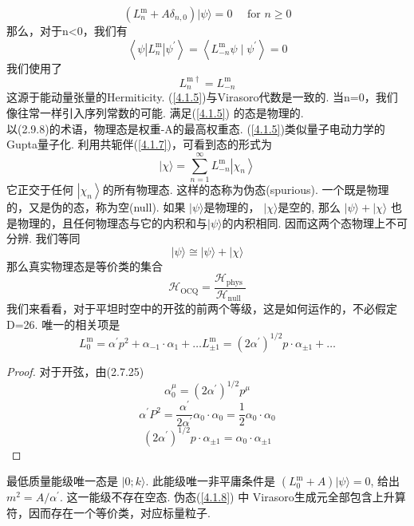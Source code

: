 \begin{equation}\label{4.1.5}
\left(L_{n}^{\mathrm{m}}+A \delta_{n, 0}\right)|\psi\rangle=0 \quad \text { for } n \geq 0
\end{equation}
那么，对于n<0，我们有
\begin{equation}
\left\langle\psi\left|L_{n}^{\mathrm{m}}\right| \psi^{\prime}\right\rangle=\left\langle L_{-n}^{\mathrm{m}} \psi \mid \psi^{\prime}\right\rangle=0
\end{equation}
我们使用了
\begin{equation}\label{4.1.7}
L_{n}^{\mathrm{m} \dagger}=L_{-n}^{\mathrm{m}}
\end{equation}
这源于能动量张量的Hermiticity. (\ref{4.1.5})与Virasoro代数是一致的. 当n=0，我们像往常一样引入序列常数的可能. 满足(\ref{4.1.5}) 的态是物理的.\\
以(2.9.8)的术语，物理态是权重-A的最高权重态. (\ref{4.1.5})类似量子电动力学的Gupta量子化. 利用共轭伴(\ref{4.1.7})，可看到态的形式为
\begin{equation}\label{4.1.8}
|\chi\rangle=\sum_{n=1}^{\infty} L_{-n}^{\mathrm{m}}\left|\chi_{n}\right\rangle
\end{equation}
它正交于任何 $\left|\chi_{n}\right\rangle $的所有物理态. 这样的态称为伪态(spurious). 一个既是物理的，又是伪的态，称为空(null). 如果 $|\psi\rangle$是物理的， $|\chi\rangle$是空的, 那么 $|\psi\rangle+|\chi\rangle$ 也是物理的，且任何物理态与它的内积和与$|\psi\rangle$的内积相同. 因而这两个态物理上不可分辨. 我们等同
\begin{equation}
|\psi\rangle \cong|\psi\rangle+|\chi\rangle
\end{equation}
那么真实物理态是等价类的集合
\begin{equation}
\mathscr{H}_{\mathrm{OCQ}}=\frac{\mathscr{H}_{\text {phys }}}{\mathscr{H}_{\text {null }}}
\end{equation}
我们来看看，对于平坦时空中的开弦的前两个等级，这是如何运作的，不必假定D=26. 唯一的相关项是
\begin{subequations}
\begin{equation}
L_{0}^{\mathrm{m}}=\alpha^{\prime} p^{2}+\alpha_{-1} \cdot \alpha_{1}+\ldots
\end{equation}
\begin{equation}
L_{\pm 1}^{\mathrm{m}}=\left(2 \alpha^{\prime}\right)^{1 / 2} p \cdot \alpha_{\pm 1}+\ldots
\end{equation}
\end{subequations}

\begin{proof}
对于开弦，由(2.7.25)
$$
\alpha_{0}^{\mu}=\left(2 \alpha^{\prime}\right)^{1 / 2} p^{\mu}
$$
$$
\alpha^{\prime} P^{2}=\frac{\alpha^{\prime}}{2 \alpha^{\prime}} \alpha_{0} \cdot \alpha_{0}=\frac{1}{2} \alpha_{0} \cdot \alpha_{0}
$$
$$
\left(2 \alpha^{\prime}\right)^{1 / 2} p \cdot \alpha_{\pm 1}=\alpha_{0} \cdot \alpha_{\pm 1}
$$
\end{proof}
\noindent
最低质量能级唯一态是 $ | 0 ; k \rangle $.  此能级唯一非平庸条件是 $\left(L_{0}^{\mathrm{m}}+A\right)|\psi\rangle=0$, 
\quad 给出$m^{2}=A / \alpha^{\prime} $.  
这一能级不存在空态.  伪态(\ref{4.1.8}) 中 Virasoro生成元全部包含上升算符，因而存在一个等价类，对应标量粒子.\\


